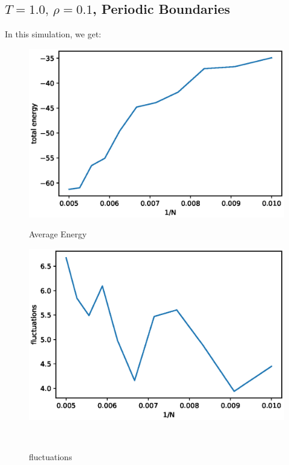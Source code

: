 \documentclass[UTF8,a4paper]{article}
\begin{document}
\subsection{$T =1.0,\, \rho = 0.1$, Periodic Boundaries}
In this simulation, we get:
\begin{figure}[H]
	\centering
	\begin{minipage}[t]{0.45\textwidth}
		\centering
		\includegraphics[height=0.2\textheight]{fig/sc_exp2_e.eps}
		\caption{Average Energy}
	\end{minipage}\hspace{0.5cm}
	\begin{minipage}[t]{0.45\textwidth}
		\centering
		\includegraphics[height=0.2\textheight]{fig/sc_exp2_p.eps}
		\caption{fluctuations}
	\end{minipage}\\
	\begin{minipage}[t]{0.6\textwidth}

\end{minipage}
\end{figure}
\end{document}
